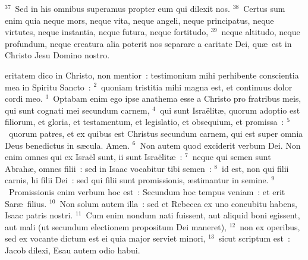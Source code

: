 ${}^{37}$~Sed in his omnibus superamus propter eum qui dilexit nos.
${}^{38}$~Certus sum enim quia neque mors, neque vita, neque angeli, neque principatus, neque virtutes, neque instantia, neque futura, neque fortitudo,
${}^{39}$~neque altitudo, neque profundum, neque creatura alia poterit nos separare a caritate Dei, qu\ae\ est in Christo Jesu Domino nostro.

\bchapter
{}eritatem dico in Christo, non mentior~: testimonium mihi perhibente conscientia mea in Spiritu Sancto~:
${}^{2}$~quoniam tristitia mihi magna est, et continuus dolor cordi meo.
${}^{3}$~Optabam enim ego ipse anathema esse a Christo pro fratribus meis, qui sunt cognati mei secundum carnem,
${}^{4}$~qui sunt Isra\"elit\ae , quorum adoptio est filiorum, et gloria, et testamentum, et legislatio, et obsequium, et promissa~:
${}^{5}$~quorum patres, et ex quibus est Christus secundum carnem, qui est super omnia Deus benedictus in s\ae cula. Amen.
${}^{6}$~Non autem quod exciderit verbum Dei. Non enim omnes qui ex Isra\"el sunt, ii sunt Isra\"elit\ae~:
${}^{7}$~neque qui semen sunt Abrah\ae , omnes filii~: sed in Isaac vocabitur tibi semen~:
${}^{8}$~id est, non qui filii carnis, hi filii Dei~: sed qui filii sunt promissionis, \ae stimantur in semine.
${}^{9}$~Promissionis enim verbum hoc est~: Secundum hoc tempus veniam~: et erit Sar\ae\ filius.
${}^{10}$~Non solum autem illa~: sed et Rebecca ex uno concubitu habens, Isaac patris nostri.
${}^{11}$~Cum enim nondum nati fuissent, aut aliquid boni egissent, aut mali (ut secundum electionem propositum Dei maneret),
${}^{12}$~non ex operibus, sed ex vocante dictum est ei quia major serviet minori,
${}^{13}$~sicut scriptum est~: Jacob dilexi, Esau autem odio habui.


